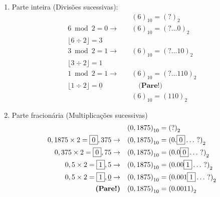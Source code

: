 \documentclass{article}
\begin{document}
            \begin{enumerate}
                \item Parte inteira (Divisões sucessivas):
                    \begin{align*}
                        &{(6)}_{10} = {(?)}_2\\
                        6 \bmod 2 = \boxed{0} \rightarrow \quad &{(6)}_{10} = {(? \ldots \boxed{0})}_2\\
                        \lfloor  6 \div 2 \rfloor = 3 \quad &\\
                        3 \bmod 2 = \boxed{1} \rightarrow \quad &{(6)}_{10} = {(? \ldots \boxed{1}0)}_2\\
                        \lfloor  3 \div 2 \rfloor = 1 \quad &\\
                        1 \bmod 2 = \boxed{1} \rightarrow \quad &{(6)}_{10} = {(? \ldots \boxed{1}10)}_2\\
                        \lfloor  1 \div 2 \rfloor = \underline{0} \quad & \quad \textbf{(Pare!)} \\
                        &{(6)}_{10} = {(110)}_2
                    \end{align*}

                \item Parte fracionária (Multiplicações sucessivas)
                    \begin{align*}
                        &{(0,1875)}_{10} = {(?)}_2\\
                        0,1875 \times 2 = \boxed{0},375 \rightarrow \quad &{(0,1875)}_{10} = {(0.\boxed{0}\ldots~?)}_2\\
                        0,375 \times 2 = \boxed{0},75 \rightarrow \quad &{(0,1875)}_{10} = {(0.0\boxed{0}\ldots~?)}_2\\
                        0,5 \times 2 = \boxed{1},5 \rightarrow \quad &{(0,1875)}_{10} = {(0.00\boxed{1}\ldots~?)}_2\\
                        0,5 \times 2 = \boxed{1},\underline{0} \rightarrow \quad &{(0,1875)}_{10} = {(0.001\boxed{1}\ldots~?)}_2\\
                        \textrm{\textbf{(Pare!)}} \quad &{(0,1875)}_{10} = {(0.0011)}_2
                    \end{align*}
                    

\end{enumerate}
\end{document}
